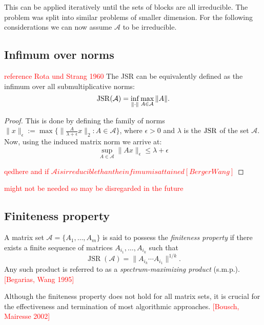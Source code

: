 This can be applied iteratively until the sets of blocks are all irreducible.
The problem was split into similar problems of smaller dimension.
For the following considerations we can now assume $\mathcal{A}$ to be irreducible.

\subsection*{Infimum over norms}
\begin{proposition}
    \textcolor{red}{reference Rota und Strang 1960}
    The JSR can be equivalently defined as the infimum over all submultiplicative norms:
    \begin{equation}
        \operatorname{JSR}(\mathcal{A}) = \inf_{\|\cdot\|} \max_{A \in \mathcal{A}} \|A\|.
    \end{equation}
\end{proposition}

\begin{proof}
    This is done by defining the family of norms $\|x\|_{\epsilon} := \max \{ \| \frac{A}{\lambda + \epsilon}x\|_2 : A \in \mathcal{A}\}$,
    where $\epsilon > 0$ and $\lambda$ is the $\operatorname{JSR}$ of the set $\mathcal{A}$.
    Now, using the induced matrix norm we arrive at: 
    $$ \sup _{A \in \mathcal{A}} \|Ax\|_{\epsilon} \leq \lambda + \epsilon$$

\textcolor{red}{qedhere and if $\mathcal{A} is irreducible than the infimum is attained [BergerWang]$}

\end{proof}

\textcolor{red}{might not be needed so may be disregarded in the future}

\subsection*{Finiteness property}
\begin{definition}
    A matrix set $\mathcal{A} = \{ A_1, \dots, A_m \}$ is said to possess the \emph{finiteness property} if there exists a finite sequence of matrices $A_{i_1}, \dots, A_{i_k}$ such that
    \begin{equation}
        \operatorname{JSR}(\mathcal{A}) = \|A_{i_k} \cdots A_{i_1}\|^{1/k}.
    \end{equation}
    Any such product is referred to as a \emph{spectrum-maximizing product} (s.m.p.).
    \textcolor{red}{[Begarias, Wang 1995]}
\end{definition}
Although the finiteness property does not hold for all matrix sets, it is crucial for the effectiveness and termination of most algorithmic approaches.
\textcolor{red}{[Bousch, Mairesse 2002]}

